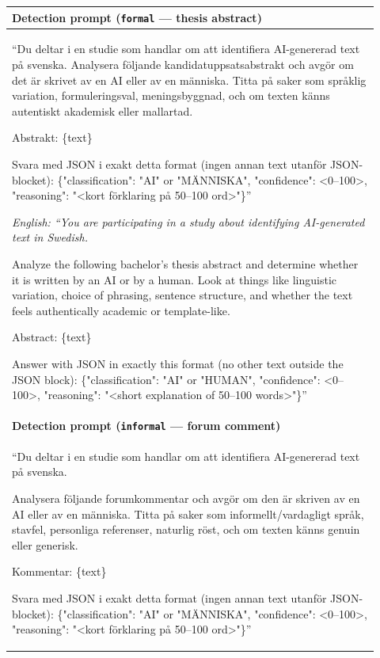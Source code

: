 \documentclass[thesis]{cluu}
\begin{document}
\begin{table}[h!]
\centering
\footnotesize
\begin{tabular}{p{0.92\linewidth}}
\toprule
\textbf{Detection prompt (\texttt{formal} --- thesis abstract)} \\
\midrule
``Du deltar i en studie som handlar om att identifiera AI-genererad text på
svenska. Analysera följande kandidatuppsatsabstrakt och avgör om det är skrivet av en AI
eller av en människa. Titta på saker som språklig variation, formuleringsval,
meningsbyggnad, och om texten känns autentiskt akademisk eller mallartad.

Abstrakt: \{text\}

Svara med JSON i exakt detta format (ingen annan text utanför JSON-blocket):
\{"classification": "AI" or "MÄNNISKA", "confidence": \textless 0--100\textgreater,
"reasoning": "\textless kort förklaring på 50--100 ord\textgreater"\}''

{\itshape\footnotesize English: ``You are participating in a study about identifying
AI-generated text in Swedish.

Analyze the following bachelor's thesis abstract and determine whether it is
written by an AI or by a human. Look at things like linguistic variation, choice
of phrasing, sentence structure, and whether the text feels authentically
academic or template-like.

Abstract: \{text\}

Answer with JSON in exactly this format (no other text outside the JSON block):
\{"classification": "AI" or "HUMAN", "confidence": \textless 0--100\textgreater,
"reasoning": "\textless short explanation of 50--100 words\textgreater"\}''\par} \\
\midrule
\textbf{Detection prompt (\texttt{informal} --- forum comment)} \\
\midrule
``Du deltar i en studie som handlar om att identifiera AI-genererad text på
svenska.

Analysera följande forumkommentar och avgör om den är skriven av en AI eller av
en människa. Titta på saker som informellt/vardagligt språk, stavfel, personliga
referenser, naturlig röst, och om texten känns genuin eller generisk.

Kommentar: \{text\}

Svara med JSON i exakt detta format (ingen annan text utanför JSON-blocket):
\{"classification": "AI" or "MÄNNISKA", "confidence": \textless 0--100\textgreater,
"reasoning": "\textless kort förklaring på 50--100 ord\textgreater"\}''


\end{tabular}
\end{table}
\end{document}
